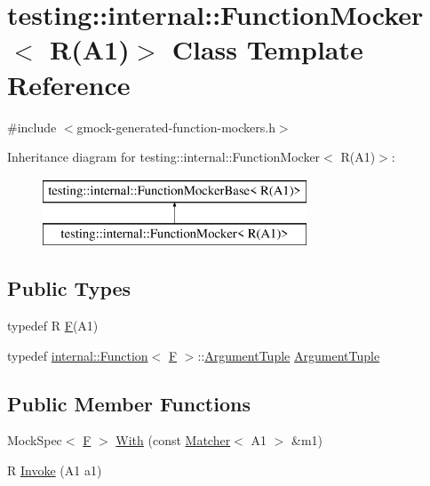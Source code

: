 \hypertarget{classtesting_1_1internal_1_1_function_mocker_3_01_r_07_a1_08_4}{}\section{testing\+::internal\+::Function\+Mocker$<$ R(A1)$>$ Class Template Reference}
\label{classtesting_1_1internal_1_1_function_mocker_3_01_r_07_a1_08_4}


{\ttfamily \#include $<$gmock-\/generated-\/function-\/mockers.\+h$>$}

Inheritance diagram for testing\+::internal\+::Function\+Mocker$<$ R(A1)$>$\+:\begin{figure}[H]
\begin{center}
\leavevmode
\includegraphics[height=2.000000cm]{da/da4/classtesting_1_1internal_1_1_function_mocker_3_01_r_07_a1_08_4}
\end{center}
\end{figure}
\subsection*{Public Types}
\begin{DoxyCompactItemize}
\item 
typedef R \mbox{\hyperlink{classtesting_1_1internal_1_1_function_mocker_3_01_r_07_a1_08_4_ada54286442ab14a18c2308cef748848f}{F}}(A1)
\item 
typedef \mbox{\hyperlink{structtesting_1_1internal_1_1_function}{internal\+::\+Function}}$<$ \mbox{\hyperlink{classtesting_1_1internal_1_1_function_mocker_3_01_r_07_a1_08_4_ada54286442ab14a18c2308cef748848f}{F}} $>$\+::\mbox{\hyperlink{classtesting_1_1internal_1_1_function_mocker_3_01_r_07_a1_08_4_aacec6412ac4343c071d7dfe965558b0b}{Argument\+Tuple}} \mbox{\hyperlink{classtesting_1_1internal_1_1_function_mocker_3_01_r_07_a1_08_4_aacec6412ac4343c071d7dfe965558b0b}{Argument\+Tuple}}
\end{DoxyCompactItemize}
\subsection*{Public Member Functions}
\begin{DoxyCompactItemize}
\item 
Mock\+Spec$<$ \mbox{\hyperlink{classtesting_1_1internal_1_1_function_mocker_3_01_r_07_a1_08_4_ada54286442ab14a18c2308cef748848f}{F}} $>$ \mbox{\hyperlink{classtesting_1_1internal_1_1_function_mocker_3_01_r_07_a1_08_4_acad7b9da099d38f5e37b63c430374cc8}{With}} (const \mbox{\hyperlink{classtesting_1_1_matcher}{Matcher}}$<$ A1 $>$ \&m1)
\item 
R \mbox{\hyperlink{classtesting_1_1internal_1_1_function_mocker_3_01_r_07_a1_08_4_a4a58d37902572c8136d999c5008dce1a}{Invoke}} (A1 a1)
\end{DoxyCompactItemize}


